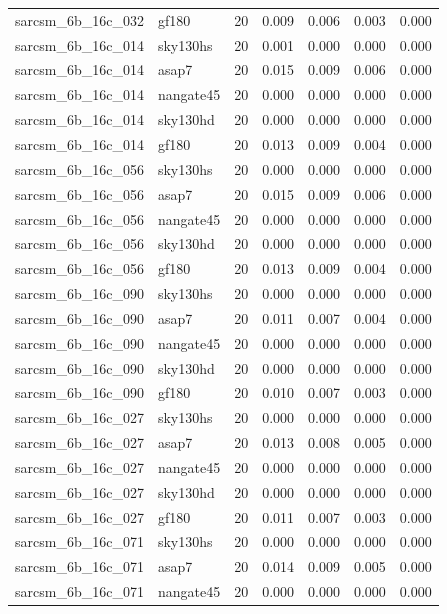 \begin{tabular}{llrrrrr}
sarcsm\_6b\_16c\_032 & gf180 & 20 & 0.009 & 0.006 & 0.003 & 0.000 \\
sarcsm\_6b\_16c\_014 & sky130hs & 20 & 0.001 & 0.000 & 0.000 & 0.000 \\
sarcsm\_6b\_16c\_014 & asap7 & 20 & 0.015 & 0.009 & 0.006 & 0.000 \\
sarcsm\_6b\_16c\_014 & nangate45 & 20 & 0.000 & 0.000 & 0.000 & 0.000 \\
sarcsm\_6b\_16c\_014 & sky130hd & 20 & 0.000 & 0.000 & 0.000 & 0.000 \\
sarcsm\_6b\_16c\_014 & gf180 & 20 & 0.013 & 0.009 & 0.004 & 0.000 \\
sarcsm\_6b\_16c\_056 & sky130hs & 20 & 0.000 & 0.000 & 0.000 & 0.000 \\
sarcsm\_6b\_16c\_056 & asap7 & 20 & 0.015 & 0.009 & 0.006 & 0.000 \\
sarcsm\_6b\_16c\_056 & nangate45 & 20 & 0.000 & 0.000 & 0.000 & 0.000 \\
sarcsm\_6b\_16c\_056 & sky130hd & 20 & 0.000 & 0.000 & 0.000 & 0.000 \\
sarcsm\_6b\_16c\_056 & gf180 & 20 & 0.013 & 0.009 & 0.004 & 0.000 \\
sarcsm\_6b\_16c\_090 & sky130hs & 20 & 0.000 & 0.000 & 0.000 & 0.000 \\
sarcsm\_6b\_16c\_090 & asap7 & 20 & 0.011 & 0.007 & 0.004 & 0.000 \\
sarcsm\_6b\_16c\_090 & nangate45 & 20 & 0.000 & 0.000 & 0.000 & 0.000 \\
sarcsm\_6b\_16c\_090 & sky130hd & 20 & 0.000 & 0.000 & 0.000 & 0.000 \\
sarcsm\_6b\_16c\_090 & gf180 & 20 & 0.010 & 0.007 & 0.003 & 0.000 \\
sarcsm\_6b\_16c\_027 & sky130hs & 20 & 0.000 & 0.000 & 0.000 & 0.000 \\
sarcsm\_6b\_16c\_027 & asap7 & 20 & 0.013 & 0.008 & 0.005 & 0.000 \\
sarcsm\_6b\_16c\_027 & nangate45 & 20 & 0.000 & 0.000 & 0.000 & 0.000 \\
sarcsm\_6b\_16c\_027 & sky130hd & 20 & 0.000 & 0.000 & 0.000 & 0.000 \\
sarcsm\_6b\_16c\_027 & gf180 & 20 & 0.011 & 0.007 & 0.003 & 0.000 \\
sarcsm\_6b\_16c\_071 & sky130hs & 20 & 0.000 & 0.000 & 0.000 & 0.000 \\
sarcsm\_6b\_16c\_071 & asap7 & 20 & 0.014 & 0.009 & 0.005 & 0.000 \\
sarcsm\_6b\_16c\_071 & nangate45 & 20 & 0.000 & 0.000 & 0.000 & 0.000 \\

\end{tabular}
